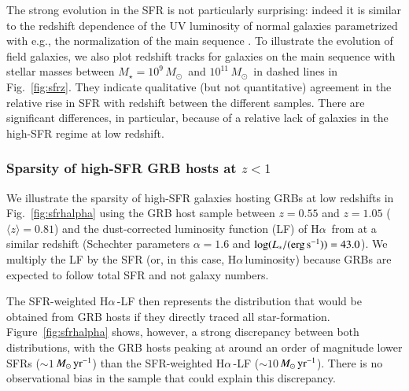 \documentclass[traditabstract, longauth]{aa}
\newcommand{\ha}{H$\alpha$}
\newcommand{\Msun}{$M_\odot$}
\newcommand{\Msunyr}{$M_\odot\,\rm{yr}^{-1}$}
\begin{document}
The strong evolution in the SFR is not particularly surprising: indeed it is similar to the redshift dependence of the UV luminosity of normal galaxies parametrized with e.g., the normalization of the main sequence \citep[e.g.,][]{2011ApJ...742...96W, 2012ApJ...754L..29W}. To illustrate the evolution of field galaxies, we also plot redshift tracks for galaxies {on the main sequence} with stellar masses between $M_{\star}=10^{9}$\,\Msun\, and $10^{11}$\,\Msun\, in dashed lines in Fig.~\ref{fig:sfrz}. They indicate qualitative (but not quantitative) agreement in the relative rise in SFR with redshift between the different samples. There are significant differences, in particular, because of a relative lack of galaxies in the high-SFR regime at low redshift.

\subsubsection{Sparsity of high-SFR GRB hosts at $z<1$}

 {We illustrate the sparsity of high-SFR galaxies hosting GRBs at low redshifts in Fig.~\ref{fig:sfrhalpha} using the GRB host sample between $z=0.55$ and $z=1.05$ ($\langle z \rangle = 0.81$) and the dust-corrected luminosity function (LF) of \ha\, from \citet{2011ApJ...726..109L} at a similar redshift (Schechter parameters $\alpha=1.6$ and $\log(L_*/(\rm{erg\,s^{-1}}))=43.0$). We multiply the LF by the SFR (or, in this case, \ha\,luminosity) because GRBs are expected to follow total SFR and not galaxy numbers.}

 {The SFR-weighted \ha\,-LF then represents the distribution that would be obtained from GRB hosts if they directly traced all star-formation. Figure~\ref{fig:sfrhalpha} shows, however, a strong discrepancy between both distributions, with the GRB hosts peaking at around an order of magnitude lower SFRs ($\sim1$\,\Msunyr) than the SFR-weighted \ha\,-LF ($\sim10$\,\Msunyr). There is no observational bias in the sample that could explain this discrepancy.}
\end{document}

